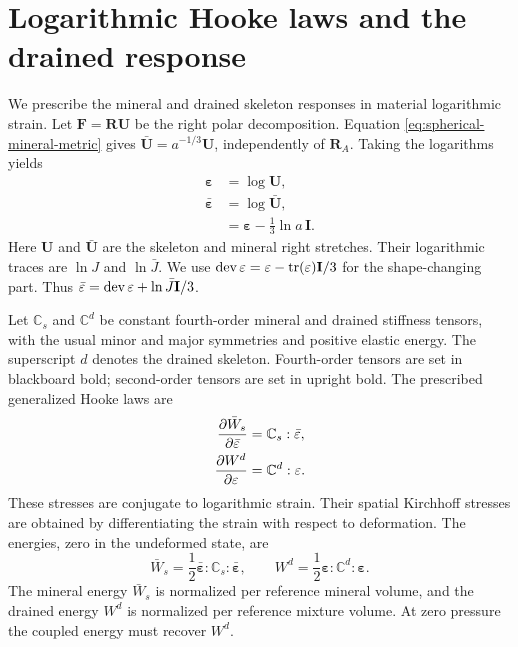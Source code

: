 \section{Logarithmic Hooke laws and the drained response}
\label{sec:stress-reconstruction}

We prescribe the mineral and drained skeleton responses in material
logarithmic strain. Let \(\mathbf F=\mathbf R\mathbf U\) be the right
polar decomposition. Equation \eqref{eq:spherical-mineral-metric} gives
\(\bar{\mathbf U}=a^{-1/3}\mathbf U\), independently of
\(\mathbf R_A\). Taking the logarithms yields
\begin{align}
 \mathbf\varepsilon&=\log\mathbf U,
 \label{eq:skeleton-logarithmic-strain}\\
 \bar{\mathbf\varepsilon}&=\log\bar{\mathbf U},
 \label{eq:mineral-logarithmic-strain}\\
 &=\mathbf\varepsilon-\frac13\ln a\,\mathbf I.
 \label{eq:constrained-mineral-logarithmic-strain}
\end{align}
Here \(\mathbf U\) and \(\bar{\mathbf U}\) are the skeleton and
mineral right stretches. Their logarithmic traces are \(\ln J\) and
\(\ln\bar J\). We use
\(\operatorname{dev}\mathbf\varepsilon=\mathbf\varepsilon
-\operatorname{tr}(\mathbf\varepsilon)\mathbf I/3\) for the shape-changing part.
Thus \(\bar{\mathbf\varepsilon}
=\operatorname{dev}\mathbf\varepsilon+\ln\bar J\mathbf I/3\).

Let \(\mathbb{C}_s\) and \(\mathbb{C}^d\) be constant fourth-order
mineral and drained stiffness tensors, with the usual minor and major
symmetries and positive elastic energy. The superscript \(d\) denotes
the drained skeleton. Fourth-order tensors are set in blackboard bold;
second-order tensors are set in upright bold. The prescribed generalized
Hooke laws are
\begin{align}
 \frac{\partial \bar W_s}{\partial \bar{\mathbf\varepsilon}}
 &=\mathbb{C}_s:\bar{\mathbf\varepsilon},
 \label{eq:prescribed-mineral-log-hooke}\\
 \frac{\partial W^d}{\partial \mathbf\varepsilon}
 &=\mathbb{C}^d:\mathbf\varepsilon.
 \label{eq:prescribed-skeleton-log-hooke}
\end{align}
These stresses are conjugate to logarithmic strain. Their spatial
Kirchhoff stresses are obtained by differentiating the strain with respect
to deformation.
The energies, zero in the undeformed state, are
\begin{equation}
 \bar W_s=\frac12\bar{\mathbf\varepsilon}:\mathbb{C}_s:
                    \bar{\mathbf\varepsilon},\qquad
 W^d=\frac12\mathbf\varepsilon:\mathbb{C}^d:\mathbf\varepsilon.
 \label{eq:prescribed-logarithmic-energies}
\end{equation}
The mineral energy \(\bar W_s\) is normalized per reference mineral
volume, and the drained energy \(W^d\) is normalized per reference
mixture volume. At zero pressure the coupled energy must recover \(W^d\).

